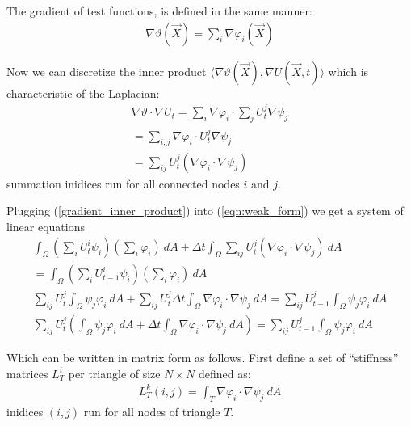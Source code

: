 \documentclass{birkjour}
\numberwithin{equation}{section}
\begin{document}
The gradient of test functions, is defined in the same manner:
\begin{eqnarray}
	\label{eqn:gradient_v}
	\nabla \vartheta(\vec X) = \sum_i { \nabla \varphi_i(\vec X) }
\end{eqnarray}

Now we can discretize the inner product $\langle \nabla \vartheta(\vec X), \nabla U(\vec X, t)\rangle$ which is characteristic of the Laplacian:
\begin{eqnarray}
	\label{gradient_inner_product}
	\nabla \vartheta \cdot \nabla U_t = \sum_i { \nabla \varphi_i } \cdot \sum_j { U_t^j \nabla \psi_j } \nonumber\\
	= \sum_{i,j} { \nabla \varphi_i \cdot U_t^j \nabla \psi_j } \nonumber\\
	= \sum_{ij} {U_t^j \left( \nabla \varphi_i \cdot \nabla \psi_j \right)}
\end{eqnarray}
summation inidices run for all connected nodes $i$ and $j$.

Plugging (\ref{gradient_inner_product}) into (\ref{eqn:weak_form}) we get a system of linear equations
\begin{eqnarray}
	\int_{\Omega}{ \left(\sum_i { U_t^i \psi_i }\right) \left( \sum_i { \varphi_i }\right) \ dA } + \Delta t \int_{\Omega}{ \sum_{ij} {U_t^j \left( \nabla \varphi_i \cdot \nabla \psi_j \right)} \ dA} \nonumber\\= \int_{\Omega} { \left(\sum_i { U_{t-1}^i \psi_i }\right) \left( \sum_i { \varphi_i }\right) \ dA } \nonumber\\
	\sum_{ij} { U_t^j \int_{\Omega}{ \psi_j \varphi_i \ dA  }} +  \sum_{ij} { U_t^j \Delta t \int_{\Omega}{ \nabla \varphi_i \cdot \nabla \psi_j \ dA }} = \sum_{ij} { U_{t-1}^j \int_{\Omega} { \psi_j \varphi_i  \ dA }} \nonumber\\
	\sum_{ij} { U_t^j \left( \int_{\Omega}{ \psi_j \varphi_i \ dA  } + \Delta t \int_{\Omega}{ \nabla \varphi_i \cdot \nabla \psi_j \ dA } \right) } = \sum_{ij} { U_{t-1}^j \int_{\Omega} { \psi_j \varphi_i  \ dA }} \nonumber
\end{eqnarray}

Which can be written in matrix form as follows. First define a set of ``stiffness'' matrices $L_T^i$ per triangle 
of size $N \times N$ defined as:
\begin{eqnarray} 
	L_T^k(i,j) = \int_{T}{ \nabla \varphi_i \cdot \nabla \psi_j \ dA} \nonumber
\end{eqnarray}
inidices $(i,j)$ run for all nodes of triangle $T$.
\end{document}

